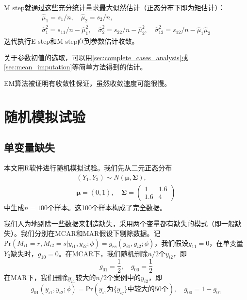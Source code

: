 \documentclass[aps,pre,12pt,preprint,onecolumn,showpacs,showkeys,AutoFakeBold]{revtex4-1}
\begin{document}
        M step就通过这些充分统计量求最大似然估计（正态分布下即为矩估计）：
        \begin{eqnarray}
            \hat \mu _1=s_1/n,\quad
            \hat \mu _2=s_2/n, \nonumber \\
            \hat \sigma _1^2=s_{11} / n - \hat \mu _1 ^2 , \quad
            \hat \sigma _2^2=s_{22} / n - \hat \mu _2 ^2 , \quad
            \hat \sigma _{12}^2=s_{12} / n -\hat \mu _1 \hat \mu _2
        \end{eqnarray}
        迭代执行E step和M step直到参数估计收敛。

        关于参数初值的选取，可以用\ref{sec:complete_cases_analysis}或\ref{sec:mean_imputation}等简单方法得到的估计。

        EM算法被证明有收敛性保证，虽然收敛速度可能很慢。


\section{随机模拟试验}
\subsection{单变量缺失}\label{sec:exp_monotone}
本文用R软件进行随机模拟试验。我们先从二元正态分布
\begin{eqnarray}
    (Y_1,Y_2)\sim N(\bm \mu, \bm \Sigma), \nonumber\\
    \bm \mu=(0,1),\quad
    \bm \Sigma =\left(
        \begin{array}{cc}
            1 & 1.6\\
            1.6 & 4
        \end{array}
        \right)
\end{eqnarray}
中生成$n=100$个样本。这100个样本构成了完全数据。

我们人为地剔除一些数据来制造缺失，采用两个变量都有缺失的模式（即一般缺失）。我们分别在MCAR和MAR假设下剔除数据。记$\mathrm{Pr}(M_{i1}=r,M_{i2}=s\vert y_{i1},y_{i2};\phi)=g_{rs}(y_{i1},y_{i2};\phi)$，我们假设$g_{11}=0$，在单变量$Y_2$缺失时，$g_{10}=0$。在MCAR下，我们随机删除$n/2$个$y_{i2}$，即
\begin{equation}
    g_{01}=\frac{1}{2}, \quad g_{00}=\frac{1}{2}
\end{equation}
在MAR下，我们删除$y_{i1}$较大的$n/2$个案例中的$y_{i2}$，即
\begin{equation}
    g_{01}(y_{i1},y_{i2};\phi)=\mathrm{Pr}(y_{i1} \text{为$\{y_{ij}\}$中较大的50个}), \quad g_{00}=1- g_{01}
\end{equation}
\end{document}
